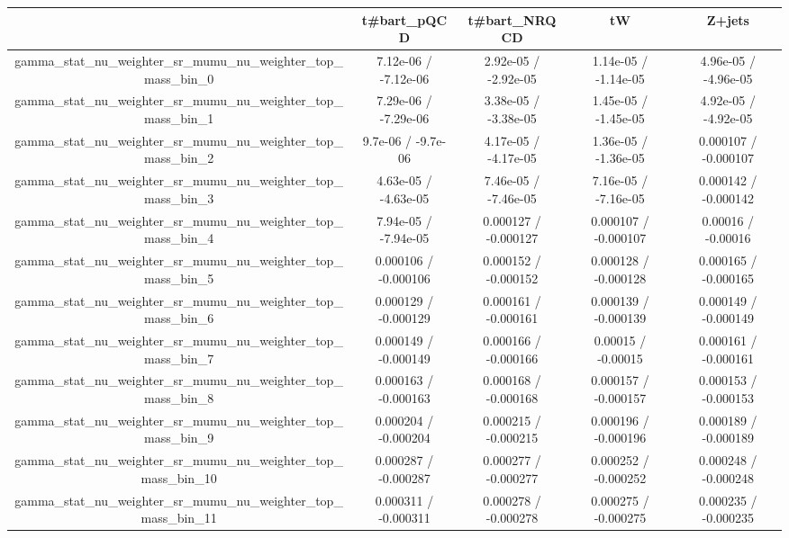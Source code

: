 \documentclass[10pt]{article}
\begin{document}
\begin{table}[htbp]
\begin{center}
\begin{tabular}{|c|c|c|c|c|}
\hline 
      & t#bar{t}_{pQCD}      & t#bar{t}_{NRQCD}      & tW      & Z+jets \\ 
\hline 
  gamma_stat_nu_weighter_sr_mumu_nu_weighter_top_mass_bin_0 & 7.12e-06 / -7.12e-06 & 2.92e-05 / -2.92e-05 & 1.14e-05 / -1.14e-05 & 4.96e-05 / -4.96e-05 \\ 
  gamma_stat_nu_weighter_sr_mumu_nu_weighter_top_mass_bin_1 & 7.29e-06 / -7.29e-06 & 3.38e-05 / -3.38e-05 & 1.45e-05 / -1.45e-05 & 4.92e-05 / -4.92e-05 \\ 
  gamma_stat_nu_weighter_sr_mumu_nu_weighter_top_mass_bin_2 & 9.7e-06 / -9.7e-06 & 4.17e-05 / -4.17e-05 & 1.36e-05 / -1.36e-05 & 0.000107 / -0.000107 \\ 
  gamma_stat_nu_weighter_sr_mumu_nu_weighter_top_mass_bin_3 & 4.63e-05 / -4.63e-05 & 7.46e-05 / -7.46e-05 & 7.16e-05 / -7.16e-05 & 0.000142 / -0.000142 \\ 
  gamma_stat_nu_weighter_sr_mumu_nu_weighter_top_mass_bin_4 & 7.94e-05 / -7.94e-05 & 0.000127 / -0.000127 & 0.000107 / -0.000107 & 0.00016 / -0.00016 \\ 
  gamma_stat_nu_weighter_sr_mumu_nu_weighter_top_mass_bin_5 & 0.000106 / -0.000106 & 0.000152 / -0.000152 & 0.000128 / -0.000128 & 0.000165 / -0.000165 \\ 
  gamma_stat_nu_weighter_sr_mumu_nu_weighter_top_mass_bin_6 & 0.000129 / -0.000129 & 0.000161 / -0.000161 & 0.000139 / -0.000139 & 0.000149 / -0.000149 \\ 
  gamma_stat_nu_weighter_sr_mumu_nu_weighter_top_mass_bin_7 & 0.000149 / -0.000149 & 0.000166 / -0.000166 & 0.00015 / -0.00015 & 0.000161 / -0.000161 \\ 
  gamma_stat_nu_weighter_sr_mumu_nu_weighter_top_mass_bin_8 & 0.000163 / -0.000163 & 0.000168 / -0.000168 & 0.000157 / -0.000157 & 0.000153 / -0.000153 \\ 
  gamma_stat_nu_weighter_sr_mumu_nu_weighter_top_mass_bin_9 & 0.000204 / -0.000204 & 0.000215 / -0.000215 & 0.000196 / -0.000196 & 0.000189 / -0.000189 \\ 
  gamma_stat_nu_weighter_sr_mumu_nu_weighter_top_mass_bin_10 & 0.000287 / -0.000287 & 0.000277 / -0.000277 & 0.000252 / -0.000252 & 0.000248 / -0.000248 \\ 
  gamma_stat_nu_weighter_sr_mumu_nu_weighter_top_mass_bin_11 & 0.000311 / -0.000311 & 0.000278 / -0.000278 & 0.000275 / -0.000275 & 0.000235 / -0.000235 \\ 

\end{tabular}
\end{center}
\end{table}
\end{document}
